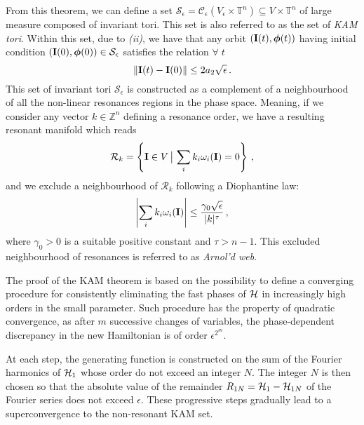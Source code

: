 From this theorem, we can define a set $\mathcal{S}_\epsilon = \mathcal{C}_\epsilon(V_\epsilon \times \mathbb{T}^n) \subseteq V \times \mathbb{T}^n$ of large measure composed of invariant tori. This set is also referred to as the set of \textit{KAM tori}. Within this set, due to \textit{(ii)}, we have that any orbit $(\vb{I}(t), \boldsymbol{\phi}(t))$ having initial condition $(\vb{I}(0), \boldsymbol{\phi}(0)) \in \mathcal{S}_\epsilon$ satisfies the relation $\forall\; t$
\begin{equation}
    \norm{\vb{I}(t) - \vb{I}(0)} \leq 2 a_2 \sqrt{\epsilon} \,.
\end{equation}
This set of invariant tori $\mathcal{S}_\epsilon$ is constructed as a complement of a neighbourhood of all the non-linear resonances regions in the phase space. Meaning, if we consider any vector $k\in \mathbb{Z}^n$ defining a resonance order, we have a resulting resonant manifold which reads
\begin{equation}
    \mathcal{R}_k = \left\{\vb{I}\in V \, \big| \, \sum_i k_i \omega_i(\vb{I}) = 0\right\} \,,
\end{equation}  
and we exclude a neighbourhood of $\mathcal{R}_k$ following a Diophantine law:
\begin{equation}
    \left|\sum_i k_i \omega_i(\vb{I})\right| \leq \frac{\gamma_0 \sqrt{\epsilon}}{|k|^\tau} \,,
    \label{eq:Diophantine-law}
\end{equation}
where $\gamma_0 > 0$ is a suitable positive constant and $\tau > n-1$. This excluded neighbourhood of resonances is referred to as \textit{Arnol'd web}.

The proof of the KAM theorem is based on the possibility to define a converging procedure for consistently eliminating the fast phases of $\mathcal{H}$ in increasingly high orders in the small parameter. Such procedure has the property of quadratic convergence, as after $m$ successive changes of variables, the phase-dependent discrepancy in the new Hamiltonian is of order $\epsilon^{2^m}$.

At each step, the generating function is constructed on the sum of the Fourier harmonics of $\mathcal{H}_1$ whose order do not exceed an integer $N$. The integer $N$ is then chosen so that the absolute value of the remainder $R_{1N} = \mathcal{H}_1 - \mathcal{H}_{1N}$ of the Fourier series does not exceed $\epsilon$. These progressive steps gradually lead to a superconvergence to the non-resonant KAM set.

